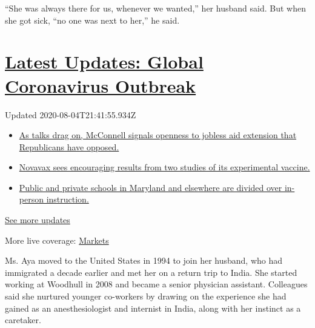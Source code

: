 ``She was always there for us, whenever we wanted,'' her husband said.
But when she got sick, ``no one was next to her,'' he said.

\hypertarget{latest-updates-global-coronavirus-outbreak}{%
\section{\texorpdfstring{\href{https://www.nytimes3xbfgragh.onion/2020/08/04/world/coronavirus-cases.html?action=click\&pgtype=Article\&state=default\&region=MAIN_CONTENT_1\&context=storylines_live_updates}{Latest
Updates: Global Coronavirus
Outbreak}}{Latest Updates: Global Coronavirus Outbreak}}\label{latest-updates-global-coronavirus-outbreak}}

Updated 2020-08-04T21:41:55.934Z

\begin{itemize}
\tightlist
\item
  \href{https://www.nytimes3xbfgragh.onion/2020/08/04/world/coronavirus-cases.html?action=click\&pgtype=Article\&state=default\&region=MAIN_CONTENT_1\&context=storylines_live_updates\#link-2daa96b5}{As
  talks drag on, McConnell signals openness to jobless aid extension
  that Republicans have opposed.}
\item
  \href{https://www.nytimes3xbfgragh.onion/2020/08/04/world/coronavirus-cases.html?action=click\&pgtype=Article\&state=default\&region=MAIN_CONTENT_1\&context=storylines_live_updates\#link-1228a480}{Novavax
  sees encouraging results from two studies of its experimental
  vaccine.}
\item
  \href{https://www.nytimes3xbfgragh.onion/2020/08/04/world/coronavirus-cases.html?action=click\&pgtype=Article\&state=default\&region=MAIN_CONTENT_1\&context=storylines_live_updates\#link-4825b93}{Public
  and private schools in Maryland and elsewhere are divided over
  in-person instruction.}
\end{itemize}

\href{https://www.nytimes3xbfgragh.onion/2020/08/04/world/coronavirus-cases.html?action=click\&pgtype=Article\&state=default\&region=MAIN_CONTENT_1\&context=storylines_live_updates}{See
more updates}

More live coverage:
\href{https://www.nytimes3xbfgragh.onion/live/2020/08/04/business/stock-market-today-coronavirus?action=click\&pgtype=Article\&state=default\&region=MAIN_CONTENT_1\&context=storylines_live_updates}{Markets}

Ms. Aya moved to the United States in 1994 to join her husband, who had
immigrated a decade earlier and met her on a return trip to India. She
started working at Woodhull in 2008 and became a senior physician
assistant. Colleagues said she nurtured younger co-workers by drawing on
the experience she had gained as an anesthesiologist and internist in
India, along with her instinct as a caretaker.

